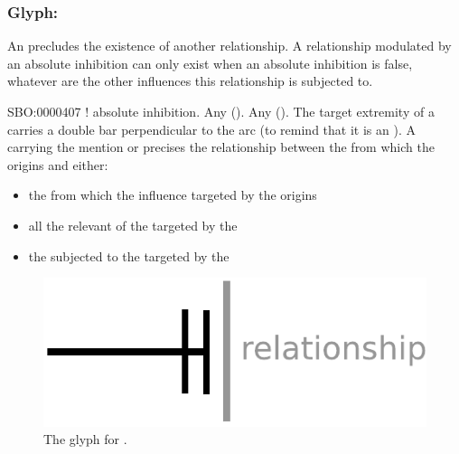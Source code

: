 
\subsubsection{Glyph: }\label{sec:absoluteInhibition}

An  precludes the existence of another relationship. A relationship modulated by an absolute inhibition can only exist when an absolute inhibition is false, whatever are the other influences this relationship is subjected to.

\begin{glyphDescription}
 \glyphSboTerm SBO:0000407 ! absolute inhibition.
 \glyphOrigin Any  ().
 \glyphTarget Any  ().
 \glyphEndPoint The target extremity of a  carries a double bar perpendicular to the arc (to remind that it is an ).
 \glyphAux A  carrying the mention  or  precises the relationship between the  from which the  origins and either:
\begin{itemize}
\item the  from which the influence targeted by the  origins
\item all the relevant  of the  targeted by the 
\item the  subjected to the  targeted by the 
\end{itemize}

 \end{glyphDescription}

\begin{figure}[H]
  \centering
  \includegraphics[scale = 0.5]{images/absoluteInhibition}
  \caption{The \ER glyph for .}
  \label{fig:absoluteInhibition}
\end{figure}

